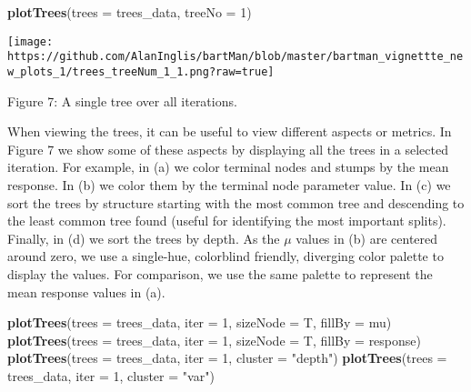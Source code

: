 \documentclass[
]{article}
\newenvironment{Shaded}{\begin{snugshade}}{\end{snugshade}}
\newcommand{\AttributeTok}[1]{\textcolor[rgb]{0.13,0.29,0.53}{#1}}
\newcommand{\DecValTok}[1]{\textcolor[rgb]{0.00,0.00,0.81}{#1}}
\newcommand{\FunctionTok}[1]{\textcolor[rgb]{0.13,0.29,0.53}{\textbf{#1}}}
\newcommand{\NormalTok}[1]{#1}
\newcommand{\StringTok}[1]{\textcolor[rgb]{0.31,0.60,0.02}{#1}}
\begin{document}
\begin{Shaded}
\begin{Highlighting}[]
\FunctionTok{plotTrees}\NormalTok{(}\AttributeTok{trees =}\NormalTok{ trees\_data, }\AttributeTok{treeNo =} \DecValTok{1}\NormalTok{)}
\end{Highlighting}
\end{Shaded}

\begin{center}\texttt{[image: https://github.com/AlanInglis/bartMan/blob/master/bartman\_vignettte\_new\_plots\_1/trees\_treeNum\_1\_1.png?raw=true]} \end{center}

\protect\hypertarget{fig7:fig7}{}{Figure 7: }A single tree over all
iterations.

When viewing the trees, it can be useful to view different aspects or
metrics. In Figure 7 we show some of these aspects by displaying all the
trees in a selected iteration. For example, in (a) we color terminal
nodes and stumps by the mean response. In (b) we color them by the
terminal node parameter value. In (c) we sort the trees by structure
starting with the most common tree and descending to the least common
tree found (useful for identifying the most important splits). Finally,
in (d) we sort the trees by depth. As the \(\mu\) values in (b) are
centered around zero, we use a single-hue, colorblind friendly,
diverging color palette to display the values. For comparison, we use
the same palette to represent the mean response values in (a).

\begin{Shaded}
\begin{Highlighting}[]
\FunctionTok{plotTrees}\NormalTok{(}\AttributeTok{trees =}\NormalTok{ trees\_data, }\AttributeTok{iter =} \DecValTok{1}\NormalTok{, }\AttributeTok{sizeNode =}\NormalTok{ T, }\AttributeTok{fillBy =} \StringTok{\textquotesingle{}mu\textquotesingle{}}\NormalTok{)}
\FunctionTok{plotTrees}\NormalTok{(}\AttributeTok{trees =}\NormalTok{ trees\_data, }\AttributeTok{iter =} \DecValTok{1}\NormalTok{, }\AttributeTok{sizeNode =}\NormalTok{ T, }\AttributeTok{fillBy =} \StringTok{\textquotesingle{}response\textquotesingle{}}\NormalTok{)}
\FunctionTok{plotTrees}\NormalTok{(}\AttributeTok{trees =}\NormalTok{ trees\_data, }\AttributeTok{iter =} \DecValTok{1}\NormalTok{, }\AttributeTok{cluster =} \StringTok{"depth"}\NormalTok{)}
\FunctionTok{plotTrees}\NormalTok{(}\AttributeTok{trees =}\NormalTok{ trees\_data, }\AttributeTok{iter =} \DecValTok{1}\NormalTok{, }\AttributeTok{cluster =} \StringTok{"var"}\NormalTok{)}
\end{Highlighting}
\end{Shaded}
\end{document}
